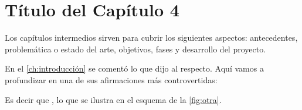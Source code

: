 \chapter{Título del Capítulo 4}
\label{ch:capítulo-cuatro}

Los capítulos intermedios sirven para cubrir los siguientes aspectos: antecedentes, problemática o estado del arte, objetivos, fases y desarrollo del proyecto.

En el \autoref{ch:introducción} se comentó lo que \cite{examplearticle} dijo al respecto. Aquí vamos a profundizar en una de sus afirmaciones más controvertidas:

\begin{displayquote}
\lipsum[7]
\end{displayquote}

Es decir que , lo que se ilustra en el esquema de la \autoref{fig:otra}.

\lipsum[2]